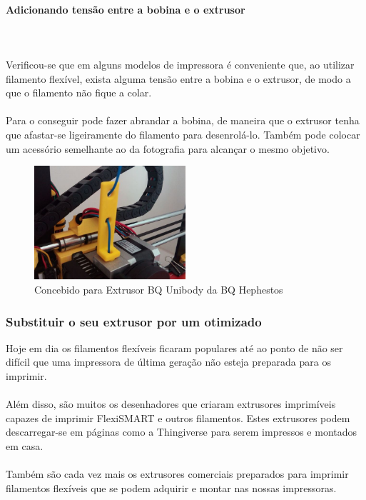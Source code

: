 \documentclass[11pt,a4paper]{article}
\begin{document}
			\paragraph{Adicionando tensão entre a bobina e o extrusor}\mbox{}\\\\
Verificou-se que em alguns modelos de impressora é conveniente que, ao utilizar filamento flexível, exista alguma tensão entre a bobina e o extrusor, de modo a que o filamento não fique a colar.
\\\\
Para o conseguir pode fazer abrandar a bobina, de maneira que o extrusor tenha que afastar-se ligeiramente do filamento para desenrolá-lo. Também pode colocar um acessório semelhante ao da fotografia para alcançar o mesmo objetivo.
\begin{figure}[H]
\centering
\includegraphics[width=0.5\textwidth,cfbox=azul_marcos 4pt 0pt]{FOTOS/SOLUCION2}
\caption*{Concebido para Extrusor BQ Unibody da BQ Hephestos}
\end{figure}
		\subsubsection{Substituir o seu extrusor por um otimizado}
Hoje em dia os filamentos flexíveis ficaram populares até ao ponto de não ser difícil que uma impressora de última geração não esteja preparada para os imprimir.
\\\\
Além disso, são muitos os desenhadores que criaram extrusores imprimíveis capazes de imprimir FlexiSMART e outros filamentos. Estes extrusores podem descarregar-se em páginas como a Thingiverse para serem impressos e montados em casa.
\\\\
Também são cada vez mais os extrusores comerciais preparados para imprimir filamentos flexíveis que se podem adquirir e montar nas nossas impressoras.
\end{document}
